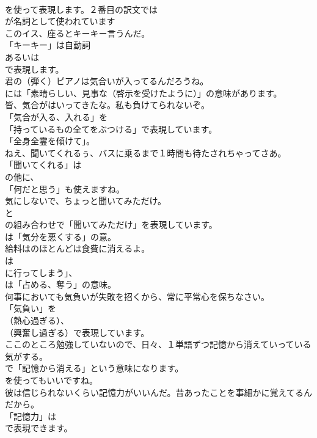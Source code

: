 \documentclass[8pt]{extreport}
\begin{document}
\begin{CJK}{UTF8}{min}
\\	を使って表現します。２番目の訳文では
\\	が名詞として使われています	
\\	このイス、座るとキーキー言うんだ。 
\\	「キーキー」は自動詞
\\	あるいは
\\	で表現します。	
\\	君の（弾く）ピアノは気合いが入ってるんだろうね。 
\\	には「素晴らしい、見事な（啓示を受けたように）」の意味があります。	
\\	皆、気合がはいってきたな。私も負けてられないぞ。 
\\	「気合が入る、入れる」を
\\	「持っているもの全てをぶつける」で表現しています。
\\	「全身全霊を傾けて」。	
\\	ねえ、聞いてくれるぅ、バスに乗るまで１時間も待たされちゃってさあ。 
\\	「聞いてくれる」は
\\	の他に、
\\	「何だと思う」も使えますね。	
\\	気にしないで、ちょっと聞いてみただけ。 
\\	と 
\\	の組み合わせで「聞いてみただけ」を表現しています。
\\	は「気分を悪くする」の意。	
\\	給料はのほとんどは食費に消えるよ。 
\\	は
\\	に行ってしまう」、
\\	は「占める、奪う」の意味。	
\\	何事においても気負いが失敗を招くから、常に平常心を保ちなさい。 
\\	「気負い」を
\\	（熱心過ぎる）、
\\	（興奮し過ぎる）で表現しています。	
\\	ここのところ勉強していないので、日々、１単語ずつ記憶から消えていっている気がする。 
\\	で「記憶から消える」という意味になります。
\\	を使ってもいいですね。	
\\	彼は信じられないくらい記憶力がいいんだ。昔あったことを事細かに覚えてるんだから。 
\\	「記憶力」は 
\\	で表現できます。

\end{CJK}
\end{document}
